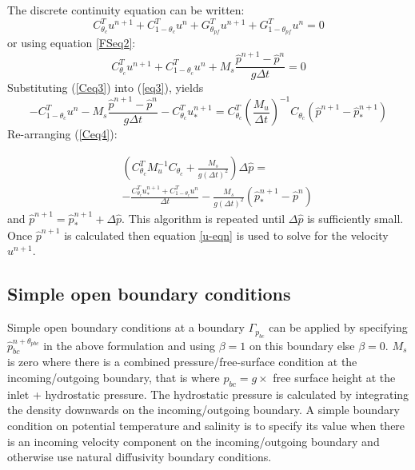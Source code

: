 \noindent
The discrete continuity equation can be written:
\begin{equation}
C_{\theta_c}^T u^{n+1}+C_{1-\theta_c}^T u^{n}
 +G_{{\theta_{pf}}}^T u^{n+1}  +G_{{1-\theta_{pf}}}^T u^{n} =0
\label{Ceq2}
\end{equation}
or using equation \ref{FSeq2}:
\begin{equation}
C_{\theta_c}^T u^{n+1}+C_{1-\theta_c}^T u^{n}
+M_s\frac{{\hat p}^{n+1}-{\hat p}^n}{g \Delta t}=0
\label{Ceq3}
\end{equation}
Substituting (\ref{Ceq3}) into (\ref{eq3}), yields
\begin{equation}
-C_{1-\theta_c}^T u^{n}
-M_s\frac{{\hat p}^{n+1}-{\hat p}^n}{g \Delta t}-C_{\theta_c}^T u_*^{n+1}
=
C_{\theta_c}^T \left(\frac{M_u}{\Delta t}\right)^{-1}C_{\theta_c}
({\hat p}^{n+1}-{\hat p}_*^{n+1})
\label{Ceq4}
\end{equation}
Re-arranging (\ref{Ceq4}):

\begin{eqnarray}
&&\left(C_{\theta_c}^T
M_u^{-1}C_{\theta_c}
+ \frac{M_s}{g (\Delta t)^2}\right) \Delta {\hat p} =  \nonumber\\
&& -\frac{
C_{\theta_c}^T u^{n+1}_*+C_{1-\theta_c}^T u^{n}
}{\Delta t}
-\frac{M_s}{g (\Delta t)^2}({\hat p}_*^{n+1}-{\hat p}^{n})
\label{Ceq5}
\end{eqnarray}
and ${\hat p}^{n+1}={\hat p}_*^{n+1}+\Delta {\hat p}$. This algorithm
is repeated until $\Delta {\hat p}$ is sufficiently small.
Once ${\hat p}^{n+1}$ is calculated then equation \ref{u-eqn}
is used to solve for the velocity $u^{n+1}$.



\subsection{Simple open boundary conditions}
\noindent
Simple open boundary conditions at a boundary $\Gamma_{p_{bc}}$ can be applied by specifying
$\hat p_{bc}^{n+\theta_{pbc}}$ in the above formulation and using $\beta=1$
on this boundary else $\beta=0$.
$M_s$ is zero where there is a combined pressure/free-surface condition at the
incoming/outgoing boundary, that is where
${\hat p}_{bc}=g \times$ free surface height at the inlet + hydrostatic pressure.
The hydrostatic pressure is calculated by integrating the density
downwards on the incoming/outgoing boundary.
A simple boundary condition on potential temperature and salinity is
to specify its value when there is an incoming velocity component
on the incoming/outgoing boundary and otherwise use natural diffusivity
boundary conditions.

